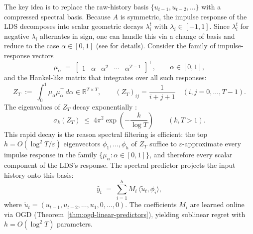 \documentclass[11pt]{article}
\theoremstyle{plain}
\theoremstyle{definition}
\theoremstyle{remark}
\newcommand{\R}{\mathbb{R}}
\begin{document}
The key idea is to replace the raw-history basis $\{u_{t-1}, u_{t-2}, \ldots\}$ with a compressed spectral basis. Because $A$ is symmetric, the impulse response of the LDS decomposes into scalar geometric decays $\lambda_i^t$ with $\lambda_i \in [-1, 1]$. Since $\lambda_i^t$ for negative $\lambda_i$ alternates in sign, one can handle this via a change of basis and reduce to the case $\alpha \in [0, 1]$ (see \citealp[Ch.~11]{hazan2025onlinecontrol} for details). Consider the family of impulse-response vectors
\begin{equation}
    \mu_\alpha \;=\; \begin{bmatrix} 1 & \alpha & \alpha^2 & \cdots & \alpha^{T-1} \end{bmatrix}^\top, \qquad \alpha \in [0, 1],
    \label{eq:impulse-vector}
\end{equation}
and the Hankel-like matrix that integrates over all such responses:
\begin{equation}
    Z_T \;:=\; \int_0^1 \mu_\alpha \mu_\alpha^\top \, d\alpha \in \R^{T \times T},
    \qquad (Z_T)_{ij} = \frac{1}{i + j + 1} \quad (i, j = 0, \ldots, T - 1).
    \label{eq:hankel-matrix}
\end{equation}
The eigenvalues of $Z_T$ decay exponentially \citep[Thm.~11.1]{hazan2025onlinecontrol}:
\begin{equation}
    \sigma_k(Z_T) \;\leq\; 4 \pi^2 \exp\!\left(-\frac{k}{\log T}\right) \qquad (k, T > 1).
    \label{eq:hankel-decay}
\end{equation}
This rapid decay is the reason spectral filtering is efficient: the top $h = O(\log^2 T / \varepsilon)$ eigenvectors $\phi_1, \ldots, \phi_h$ of $Z_T$ suffice to $\varepsilon$-approximate every impulse response in the family $\{\mu_\alpha : \alpha \in [0, 1]\}$, and therefore every scalar component of the LDS's response. The spectral predictor projects the input history onto this basis:
\begin{equation}
    \hat y_t \;=\; \sum_{i=1}^{h} M_i \, \langle \tilde u_t, \phi_i \rangle,
    \label{eq:spectral-predictor}
\end{equation}
where $\tilde u_t = (u_{t-1}, u_{t-2}, \ldots, u_1, 0, \ldots, 0)$. The coefficients $M_i$ are learned online via OGD (Theorem~\ref{thm:ogd-linear-predictors}), yielding sublinear regret with $h = O(\log^2 T)$ parameters.
\end{document}
